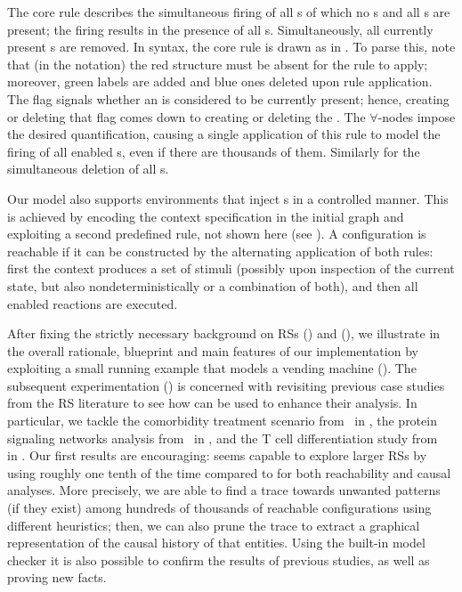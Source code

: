The core rule describes the simultaneous firing of all s of which no s and all s are present; the firing results in the presence of all s. Simultaneously, all currently present s are removed. In \GROOVE syntax, the core rule is drawn as in .
To parse this, note that (in the \GROOVE notation) the red structure must be absent for the rule to apply; moreover, green labels are added and blue ones deleted upon rule application. The  flag signals whether an  is considered to be currently present; hence, creating or deleting that flag comes down to creating or deleting the . The $\forall$-nodes impose the desired quantification, causing a single application of this rule to model the firing of all enabled s, even if there are thousands of them.
Similarly for the simultaneous deletion of all s.

Our model also supports environments that inject s in a controlled manner. This is achieved by encoding the context specification in the initial graph and exploiting a second predefined rule, not shown here (see ). A configuration is reachable if it can be constructed by the alternating application of both rules: first the context produces a set of stimuli (possibly upon inspection of the current state, but also nondeterministically or a combination of both), and then all enabled reactions are executed.

After fixing the strictly necessary background on RSs () and \GROOVE (), we illustrate in  the overall rationale, blueprint and main features of our implementation  by exploiting a small running example that models a vending machine ().
The subsequent experimentation () is concerned with revisiting previous case studies from the RS literature to see how \GROOVE can be used to enhance their analysis. 
In particular, we tackle 
the comorbidity treatment scenario from~\cite{DBLP:conf/cmsb/BowlesBBFGM24} in , 
the protein signaling networks analysis from~\cite{DBLP:conf/cmsb/BallisBFO24} in , and
the T cell differentiation study from~\cite{datamod2023} in .
Our first results are encouraging: \GROOVE seems capable to explore larger RSs 
by using roughly one tenth of the time compared to \BioResolve for both reachability and causal analyses.
More precisely, we are able to find a trace towards unwanted patterns (if they exist) among hundreds of thousands of reachable configurations using different heuristics; then, we can also prune the trace to extract a graphical representation of the causal history of that entities. Using the built-in model checker it is also possible to confirm the results of previous studies, as well as proving new facts.

